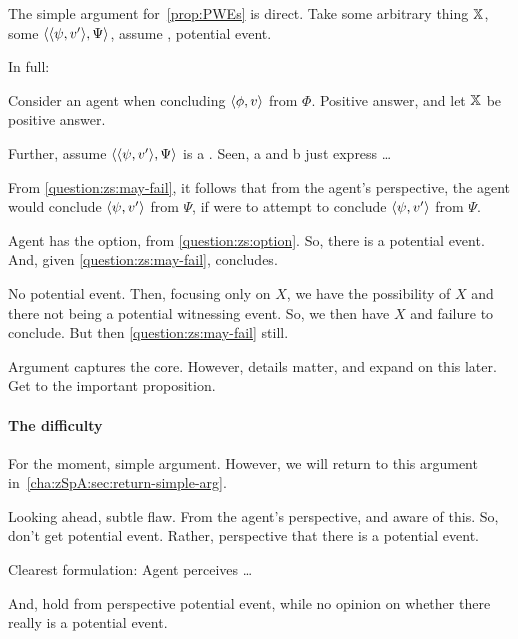 \begin{note}
  The simple argument for~\autoref{prop:PWEs} is direct.
  Take some arbitrary thing \(\qzSaV{}\), some \(\pvp{\psi}{v'}{\Psi}\), assume \requ{}, potential event.

  In full:


  Consider an agent when concluding \(\pv{\phi}{v}\) from \(\Phi\).
  Positive answer, and let \(\qzSaV{}\) be positive answer.

  Further, assume \(\pvp{\psi}{v'}{\Psi}\) is a \requ{}.
  { \color{red} Seen, a and b just express \requ{}\dots}

  From \qzS{} \ref{question:zs:may-fail}, it follows that from the agent's perspective, the agent would conclude \(\pv{\psi}{v'}\) from \(\Psi\), if \vAgent{} were to attempt to conclude \(\pv{\psi}{v'}\) from \(\Psi\).

  Agent has the option, from \ref{question:zs:option}.
  So, there is a potential event.
  And, given \ref{question:zs:may-fail}, concludes.
\end{note}

\begin{note}
  No potential event.
  Then, focusing only on \(X\), we have the possibility of \(X\) and there not being a potential witnessing event.
  So, we then have \(X\) and failure to conclude.
  But then \ref{question:zs:may-fail} still.
\end{note}

\begin{note}
  Argument captures the core.
  However, details matter, and expand on this later.
  Get to the important proposition.
\end{note}

\paragraph{The difficulty}

\begin{note}
  For the moment, simple argument.
  However, we will return to this argument in~\autoref{cha:zSpA:sec:return-simple-arg}.

  Looking ahead, subtle flaw.
  From the agent's perspective, and aware of this.
  So, don't get potential event.
  Rather, perspective that there is a potential event.

  Clearest formulation:
  Agent perceives \dots

  And, hold from perspective potential event, while no opinion on whether there really is a potential event.
\end{note}

